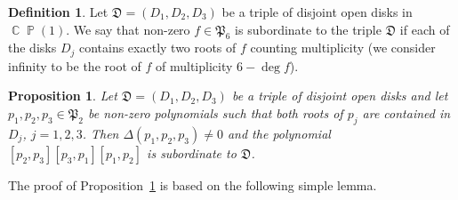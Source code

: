 \documentclass{amsart}
\numberwithin{equation}{section}
\newtheorem{proposition}[theorem]{Proposition}
\theoremstyle{definition}
\newtheorem{definition}[theorem]{Definition}
\theoremstyle{remark}
\DeclareMathOperator{\CC}{\mathbb C}
\DeclareMathOperator{\PP}{\mathbb P}
\begin{document}
	\begin{definition}
		Let $\mathfrak D = (D_1, D_2, D_3)$ be a triple of disjoint open disks in $\CC\PP(1)$. We say that non-zero $f \in \mathfrak P_6$ is subordinate to the triple $\mathfrak D$ if each of the disks $D_j$ contains exactly two roots of $f$ counting multiplicity (we consider infinity to be the root of $f$ of multiplicity $6 - \deg f$). 
	\end{definition}
	
	
	\begin{proposition}\label{propDiskSubordination}
		Let $\mathfrak D = (D_1, D_2, D_3)$ be a triple of disjoint open disks and let $p_1,p_2,p_3 \in \mathfrak P_2$ be non-zero polynomials such that both roots of $p_j$ are contained in $D_j$, $j = 1,2,3$. Then $\Delta(p_1, p_2, p_3) \ne 0$ and the polynomial $[p_2,p_3][p_3, p_1][p_1,p_2]$ is subordinate to $\mathfrak D$. 
	\end{proposition}
	
	The proof of Proposition~\ref{propDiskSubordination} is based on the following simple lemma.
	
\end{document}
